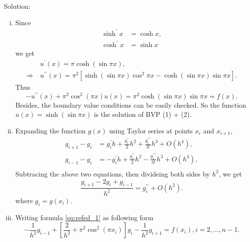 \documentclass{ctexart}
\begin{document}
\noindent Solution:
\begin{enumerate}[i)]
	\item Since
	\begin{equation*}
		\begin{aligned}
			\sinh^\prime x &= \cosh x, \\
			\cosh^\prime x &= \sinh x
		\end{aligned}
	\end{equation*}
	we get
	\begin{equation*}
		\begin{aligned}
			&u^\prime(x) = \pi\cosh(\sin \pi x), \\ 
			\Rightarrow ~ &u^{\prime\prime}(x) = \pi^2\left[\sinh(\sin\pi x)\cos^2\pi x - \cosh(\sin\pi x)\sin\pi x\right].
		\end{aligned}
	\end{equation*}
	Thus
	\begin{equation*}
		-u^{\prime\prime}(x) + \pi^2\cos^2(\pi x)u(x) = \pi^2\cosh(\sin\pi x)\sin\pi x = f(x).
	\end{equation*}
	Besides, the boundary value conditions can be easily checked. So the function $u(x) = \sinh(\sin\pi x)$ is the solution of BVP (1) + (2).
	
	\item Expanding the function $g(x)$ using Taylor series at points $x_i$ and $x_{i+1}$, 
		\begin{equation*}
			\begin{aligned}
				g_{i+1} - g_i &= g^\prime_i h + \frac{g^{\prime\prime}_i}{2}h^2 + \frac{g^{\prime\prime\prime}_i}{3!}h^3 + O(h^4), \\
				g_{i-1} - g_i &= -g^\prime_i h + \frac{g^{\prime\prime}_i}{2}h^2 - \frac{g^{\prime\prime\prime}_i}{3!}h^3 + O(h^4), \\
			\end{aligned}
		\end{equation*}
		Subtracing the above two equations, then divideing both sides by $h^2$, we get
			\begin{equation*}
				\frac{g_{i+1} - 2g_i + g_{i-1}}{h^2} = g^{\prime\prime}_i + O(h^2).
			\end{equation*}
		where $g_i = g(x_i)$.
		
		\item Writing formula \eqref{eq:refed_1} as following form
			\begin{equation}
				-\frac{1}{h^2}g_{i-1} + \left[\frac{2}{h^2} + \pi^2\cos^2(\pi x_i) \right]g_i - \frac{1}{h^2}g_{i+1} = f(x_i), i =  2, \dots, n-1. \label{eq:refed_2}
			\end{equation}
		

\end{enumerate}
\end{document}
